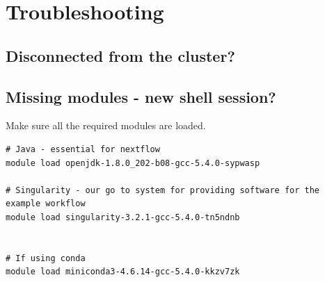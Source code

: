 %



\section{Troubleshooting}

\subsection{Disconnected from the cluster?}  

\subsection{Missing modules - new shell session?}



Make sure all the required modules are loaded. 

\begin{steps}
\begin{lstlisting}
# Java - essential for nextflow
module load openjdk-1.8.0_202-b08-gcc-5.4.0-sypwasp 

# Singularity - our go to system for providing software for the example workflow
module load singularity-3.2.1-gcc-5.4.0-tn5ndnb


# If using conda 
module load miniconda3-4.6.14-gcc-5.4.0-kkzv7zk
\end{lstlisting}
\end{steps}




